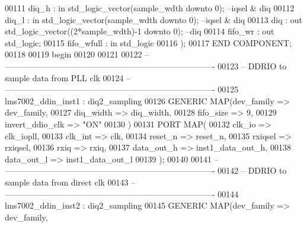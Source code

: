 \begin{DoxyCode}
00111             diq_h           : \textcolor{keywordflow}{in} \textcolor{comment}{std\_logic\_vector}(sample_wdth \textcolor{keywordflow}{downto} \textcolor{vhdllogic}{}\textcolor{vhdllogic}{0});    \textcolor{keyword}{--iqsel & diq}
00112             diq_l           : \textcolor{keywordflow}{in} \textcolor{comment}{std\_logic\_vector}(sample_wdth \textcolor{keywordflow}{downto} \textcolor{vhdllogic}{}\textcolor{vhdllogic}{0});    \textcolor{keyword}{--iqsel & diq}
00113             diq         : \textcolor{keywordflow}{out} \textcolor{comment}{std\_logic\_vector}((\textcolor{vhdllogic}{}\textcolor{vhdllogic}{2}*sample_wdth)\textcolor{vhdlchar}{-}\textcolor{vhdllogic}{}\textcolor{vhdllogic}{1} \textcolor{keywordflow}{downto} \textcolor{vhdllogic}{}\textcolor{vhdllogic}{0}); \textcolor{keyword}{--diq}
00114             fifo_wr     : \textcolor{keywordflow}{out} \textcolor{comment}{std\_logic};
00115             fifo_wfull  : \textcolor{keywordflow}{in} \textcolor{comment}{std\_logic}
00116     );
00117 \textcolor{keywordflow}{END} \textcolor{keywordflow}{COMPONENT};
00118 
00119 \textcolor{vhdlkeyword}{begin}
00120 
00121 
00122 \textcolor{keyword}{-- ----------------------------------------------------------------------------}
00123 \textcolor{keyword}{-- DDRIO to sample data from PLL clk}
00124 \textcolor{keyword}{-- ----------------------------------------------------------------------------}
00125 lms7002_ddin_inst1 : diq2_sampling
00126 \textcolor{keywordflow}{GENERIC} \textcolor{keywordflow}{MAP}(dev_family          => dev_family,
00127                 diq_width           => diq_width,
00128                 fifo_size           => \textcolor{vhdllogic}{9},
00129                 invert_ddio_clk => \textcolor{keyword}{"ON"}
00130             \textcolor{vhdlchar}{)}
00131 \textcolor{keywordflow}{PORT} \textcolor{keywordflow}{MAP}(
00132         clk_io      => clk_iopll,
00133         clk_int     => clk,
00134         reset_n         => reset_n,
00135         rxiqsel         => rxiqsel,
00136         rxiq            => rxiq,
00137         data_out_h  => inst1_data_out_h,
00138         data_out_l  => inst1_data_out_l
00139         \textcolor{vhdlchar}{)};
00140         
00141 \textcolor{keyword}{-- ----------------------------------------------------------------------------}
00142 \textcolor{keyword}{-- DDRIO to sample data from direct clk}
00143 \textcolor{keyword}{-- ----------------------------------------------------------------------------}
00144 lms7002_ddin_inst2 : diq2_sampling
00145 \textcolor{keywordflow}{GENERIC} \textcolor{keywordflow}{MAP}(dev_family          => dev_family,

\end{DoxyCode}
